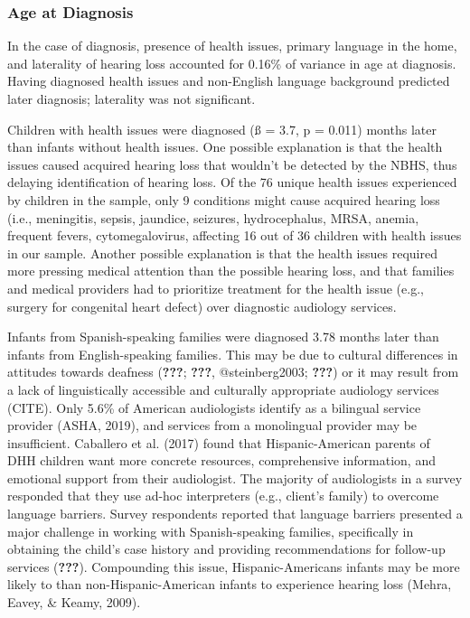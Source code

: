\documentclass[english,man]{apa6}
\begin{document}
\hypertarget{age-at-diagnosis}{%
\subsubsection{Age at Diagnosis}\label{age-at-diagnosis}}

In the case of diagnosis, presence of health issues, primary language in the home, and laterality of hearing loss accounted for 0.16\% of variance in age at diagnosis. Having diagnosed health issues and non-English language background predicted later diagnosis; laterality was not significant.

Children with health issues were diagnosed (ß = 3.7, p = 0.011) months later than infants without health issues. One possible explanation is that the health issues caused acquired hearing loss that wouldn't be detected by the NBHS, thus delaying identification of hearing loss. Of the 76 unique health issues experienced by children in the sample, only 9 conditions might cause acquired hearing loss (i.e., meningitis, sepsis, jaundice, seizures, hydrocephalus, MRSA, anemia, frequent fevers, cytomegalovirus, affecting 16 out of 36 children with health issues in our sample. Another possible explanation is that the health issues required more pressing medical attention than the possible hearing loss, and that families and medical providers had to prioritize treatment for the health issue (e.g., surgery for congenital heart defect) over diagnostic audiology services.

Infants from Spanish-speaking families were diagnosed 3.78 months later than infants from English-speaking families. This may be due to cultural differences in attitudes towards deafness ({\textbf{???}}; {\textbf{???}}, @steinberg2003; {\textbf{???}}) or it may result from a lack of linguistically accessible and culturally appropriate audiology services (CITE). Only 5.6\% of American audiologists identify as a bilingual service provider (ASHA, 2019), and services from a monolingual provider may be insufficient. Caballero et al. (2017) found that Hispanic-American parents of DHH children want more concrete resources, comprehensive information, and emotional support from their audiologist. The majority of audiologists in a survey responded that they use ad-hoc interpreters (e.g., client's family) to overcome language barriers. Survey respondents reported that language barriers presented a major challenge in working with Spanish-speaking families, specifically in obtaining the child's case history and providing recommendations for follow-up services ({\textbf{???}}). Compounding this issue, Hispanic-Americans infants may be more likely to than non-Hispanic-American infants to experience hearing loss (Mehra, Eavey, \& Keamy, 2009).
\end{document}
